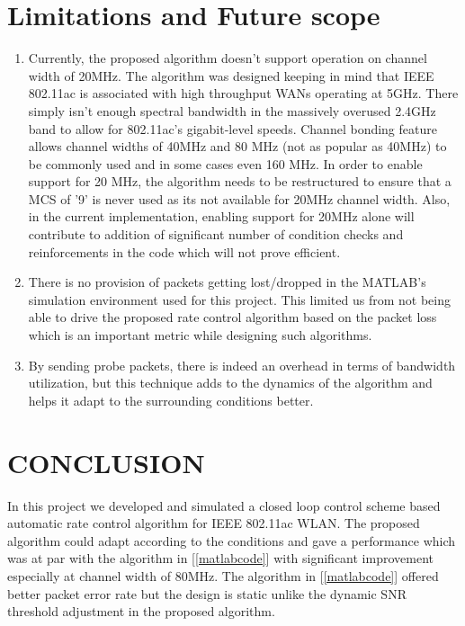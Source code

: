 \documentclass[a4paper, 10pt, conference]{ieeeconf}
\begin{document}
\section{Limitations and Future scope}

\begin{enumerate}
    \item Currently, the proposed algorithm doesn't support operation on channel width of 20MHz. The algorithm was designed keeping in mind that IEEE 802.11ac is associated with high throughput WANs operating at 5GHz. There simply isn't enough spectral bandwidth in the massively overused 2.4GHz band to allow for 802.11ac’s gigabit-level speeds. Channel bonding feature allows channel widths of 40MHz and 80 MHz (not as popular as 40MHz) to be commonly used and in some cases even 160 MHz. In order to enable support for 20 MHz, the algorithm needs to be restructured to ensure that a MCS of '9' is never used as its not available for 20MHz channel width. Also, in the current implementation, enabling support for 20MHz alone will contribute to addition of significant number of condition checks and reinforcements in the code which will not prove efficient.
    
    \item There is no provision of packets getting lost/dropped in the MATLAB's simulation environment used for this project. This limited us from not being able to drive the proposed rate control algorithm based on the packet loss which is an important metric while designing such algorithms.
    
    \item By sending probe packets, there is indeed an overhead in terms of bandwidth utilization, but this technique adds to the dynamics of the algorithm and helps it adapt to the surrounding conditions better.
\end{enumerate}

 

\section{CONCLUSION}

In this project we developed and simulated a closed loop control scheme based automatic rate control algorithm for IEEE 802.11ac WLAN. The proposed algorithm could adapt according to the conditions and gave a performance which was at par with the algorithm in [\ref{matlabcode}] with significant improvement especially at channel width of 80MHz. The algorithm in [\ref{matlabcode}] offered better packet error rate but the design is static unlike the dynamic SNR threshold adjustment in the proposed algorithm.  
\end{document}
